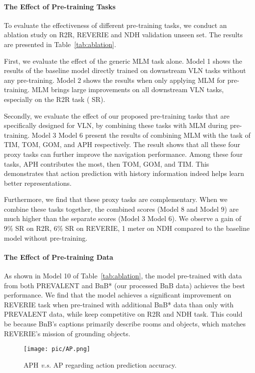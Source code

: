 \documentclass[10pt,twocolumn,letterpaper]{article}
\begin{document}
\paragraph{The Effect of Pre-training Tasks}
To evaluate the effectiveness of different pre-training tasks, we conduct an ablation study on R2R, REVERIE and NDH validation unseen set. The results are presented in Table~\ref{tab:ablation}.

First, we evaluate the effect of the generic MLM task alone. Model 1 shows the results of the baseline model directly trained on downstream VLN tasks without any pre-training. Model 2 shows the results when only applying MLM for pre-training. MLM brings large improvements on all downstream VLN tasks, especially on the R2R task ( SR). 

Secondly, we evaluate the effect of our proposed pre-training tasks that are specifically designed for VLN, by combining these tasks with MLM during pre-training. 
Model 3 Model 6 present the results of combining MLM with the task of TIM, TOM, GOM, and APH respectively. The result shows that all these four proxy tasks can further improve the navigation performance.
Among these four tasks, APH contributes the most, then TOM, GOM, and TIM. 
This demonstrates that action prediction with history information indeed helps learn better representations.

Furthermore, we find that these proxy tasks are complementary. When we combine these tasks together, the combined scores (Model 8 and Model 9) are much higher than the separate scores (Model 3 Model 6).
We observe a gain of 9\% SR on R2R, 6\% SR on REVERIE, 1 meter on NDH compared to the baseline model without pre-training.

\vspace{-3pt}
\paragraph{The Effect of Pre-training Data}
As shown in Model 10 of Table~\ref{tab:ablation}, the model pre-trained with data from both PREVALENT and BnB* (our processed BnB data) achieves the best performance. 
We find that the model achieves a significant improvement on REVERIE task when pre-trained with additional BnB* data than only with PREVALENT data, while keep competitive on R2R and NDH task.
This could be because BnB's captions primarily describe rooms and objects, which matches REVERIE's mission of grounding objects.

\begin{figure}[!t]
	\begin{center}
		\texttt{[image: pic/AP.png]}
	\end{center}
	\vspace{-10pt}
	\caption{APH \textit{v.s.} AP regarding action prediction accuracy.
	}
	\label{fig:AP}
	\vspace{-7pt}
\end{figure}
\end{document}
